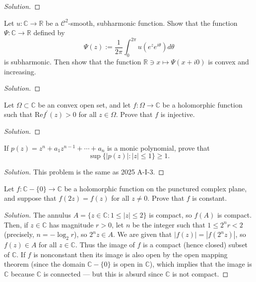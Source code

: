\documentclass[10pt]{article}
\providecommand{\CC}{\mathbb C}
\newenvironment{soln}{\begin{proof}[Solution]}{\end{proof}}
\providecommand{\abs}[1]{\left\lvert #1\right\rvert}
\begin{document}
\begin{soln}

\end{soln}



\begin{problem}
[2011 J-I-4]
Let $u: \mathbb{C} \rightarrow \mathbb{R}$ be a $\mathscr{C}^2$-smooth, subharmonic function. Show that the function $\Psi: \mathbb{C} \rightarrow \mathbb{R}$ defined by
$$
\Psi(z):=\frac{1}{2 \pi} \int_0^{2 \pi} u\left(e^z e^{i \theta}\right) d \theta
$$
is subharmonic. Then show that the function $\mathbb{R} \ni x \mapsto \Psi(x+i 0)$ is convex and increasing.
\end{problem}

\begin{soln}

\end{soln}



\begin{problem}
[2011 A-I-3]
Let $\Omega \subset \mathbb{C}$ be an convex open set, and let $f: \Omega \rightarrow \mathbb{C}$ be a holomorphic function such that $\text{Re} f^{\prime}(z)>0$ for all $z \in \Omega.$ Prove that $f$ is injective.
\end{problem}

\begin{soln}

\end{soln}



\begin{problem}
[2011 A-II-3]
If $p(z)=z^n+a_1 z^{n-1}+\cdots+a_n$ is a monic polynomial, prove that
$$
\sup \{|p(z)| : |z| \leq 1\} \geq 1.
$$
\end{problem}

\begin{soln}
This problem is the same as 2025 A-I-3.
\end{soln}



\begin{problem}
[2010 J-I-1]
Let $f: \mathbb{C}-\{0\} \rightarrow \mathbb{C}$ be a holomorphic function on the punctured complex plane, and suppose that $f(2 z)=f(z)$ for all $z \neq 0.$ Prove that $f$ is constant.
\end{problem}

\begin{soln}
    The annulus $A = \{z\in\CC : 1 \le \abs z \le 2\}$
    is compact, so $f(A)$ is compact.
    Then, if $z\in\CC$ has magnitude $r > 0$,
    let $n$ be the integer such that $1\le 2^nr < 2$
    (precisely, $n = -\log_2r$), so $2^nz\in A$.
    We are given that $\abs{f(z)} = \abs{f(2^nz)}$,
    so $f(z)\in A$ for all $z\in\CC$.
    Thus the image of $f$ is a compact (hence closed) subset of $\CC$.
    If $f$ is nonconstant then its image
    is also open by the open mapping theorem
    (since the domain $\CC - \{0\}$ is open in $\CC$),
    which implies that the image is $\CC$
    because $\CC$ is connected --- but this is absurd
    since $\CC$ is not compact.
\end{soln}
\end{document}
